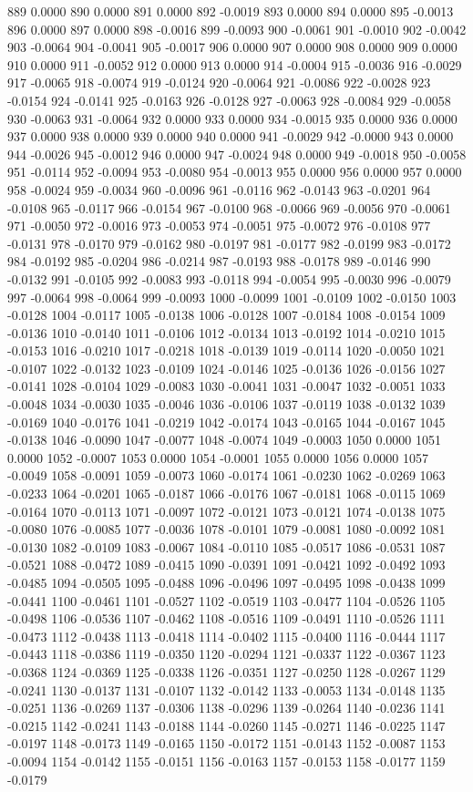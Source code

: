 889 0.0000
890 0.0000
891 0.0000
892 -0.0019
893 0.0000
894 0.0000
895 -0.0013
896 0.0000
897 0.0000
898 -0.0016
899 -0.0093
900 -0.0061
901 -0.0010
902 -0.0042
903 -0.0064
904 -0.0041
905 -0.0017
906 0.0000
907 0.0000
908 0.0000
909 0.0000
910 0.0000
911 -0.0052
912 0.0000
913 0.0000
914 -0.0004
915 -0.0036
916 -0.0029
917 -0.0065
918 -0.0074
919 -0.0124
920 -0.0064
921 -0.0086
922 -0.0028
923 -0.0154
924 -0.0141
925 -0.0163
926 -0.0128
927 -0.0063
928 -0.0084
929 -0.0058
930 -0.0063
931 -0.0064
932 0.0000
933 0.0000
934 -0.0015
935 0.0000
936 0.0000
937 0.0000
938 0.0000
939 0.0000
940 0.0000
941 -0.0029
942 -0.0000
943 0.0000
944 -0.0026
945 -0.0012
946 0.0000
947 -0.0024
948 0.0000
949 -0.0018
950 -0.0058
951 -0.0114
952 -0.0094
953 -0.0080
954 -0.0013
955 0.0000
956 0.0000
957 0.0000
958 -0.0024
959 -0.0034
960 -0.0096
961 -0.0116
962 -0.0143
963 -0.0201
964 -0.0108
965 -0.0117
966 -0.0154
967 -0.0100
968 -0.0066
969 -0.0056
970 -0.0061
971 -0.0050
972 -0.0016
973 -0.0053
974 -0.0051
975 -0.0072
976 -0.0108
977 -0.0131
978 -0.0170
979 -0.0162
980 -0.0197
981 -0.0177
982 -0.0199
983 -0.0172
984 -0.0192
985 -0.0204
986 -0.0214
987 -0.0193
988 -0.0178
989 -0.0146
990 -0.0132
991 -0.0105
992 -0.0083
993 -0.0118
994 -0.0054
995 -0.0030
996 -0.0079
997 -0.0064
998 -0.0064
999 -0.0093
1000 -0.0099
1001 -0.0109
1002 -0.0150
1003 -0.0128
1004 -0.0117
1005 -0.0138
1006 -0.0128
1007 -0.0184
1008 -0.0154
1009 -0.0136
1010 -0.0140
1011 -0.0106
1012 -0.0134
1013 -0.0192
1014 -0.0210
1015 -0.0153
1016 -0.0210
1017 -0.0218
1018 -0.0139
1019 -0.0114
1020 -0.0050
1021 -0.0107
1022 -0.0132
1023 -0.0109
1024 -0.0146
1025 -0.0136
1026 -0.0156
1027 -0.0141
1028 -0.0104
1029 -0.0083
1030 -0.0041
1031 -0.0047
1032 -0.0051
1033 -0.0048
1034 -0.0030
1035 -0.0046
1036 -0.0106
1037 -0.0119
1038 -0.0132
1039 -0.0169
1040 -0.0176
1041 -0.0219
1042 -0.0174
1043 -0.0165
1044 -0.0167
1045 -0.0138
1046 -0.0090
1047 -0.0077
1048 -0.0074
1049 -0.0003
1050 0.0000
1051 0.0000
1052 -0.0007
1053 0.0000
1054 -0.0001
1055 0.0000
1056 0.0000
1057 -0.0049
1058 -0.0091
1059 -0.0073
1060 -0.0174
1061 -0.0230
1062 -0.0269
1063 -0.0233
1064 -0.0201
1065 -0.0187
1066 -0.0176
1067 -0.0181
1068 -0.0115
1069 -0.0164
1070 -0.0113
1071 -0.0097
1072 -0.0121
1073 -0.0121
1074 -0.0138
1075 -0.0080
1076 -0.0085
1077 -0.0036
1078 -0.0101
1079 -0.0081
1080 -0.0092
1081 -0.0130
1082 -0.0109
1083 -0.0067
1084 -0.0110
1085 -0.0517
1086 -0.0531
1087 -0.0521
1088 -0.0472
1089 -0.0415
1090 -0.0391
1091 -0.0421
1092 -0.0492
1093 -0.0485
1094 -0.0505
1095 -0.0488
1096 -0.0496
1097 -0.0495
1098 -0.0438
1099 -0.0441
1100 -0.0461
1101 -0.0527
1102 -0.0519
1103 -0.0477
1104 -0.0526
1105 -0.0498
1106 -0.0536
1107 -0.0462
1108 -0.0516
1109 -0.0491
1110 -0.0526
1111 -0.0473
1112 -0.0438
1113 -0.0418
1114 -0.0402
1115 -0.0400
1116 -0.0444
1117 -0.0443
1118 -0.0386
1119 -0.0350
1120 -0.0294
1121 -0.0337
1122 -0.0367
1123 -0.0368
1124 -0.0369
1125 -0.0338
1126 -0.0351
1127 -0.0250
1128 -0.0267
1129 -0.0241
1130 -0.0137
1131 -0.0107
1132 -0.0142
1133 -0.0053
1134 -0.0148
1135 -0.0251
1136 -0.0269
1137 -0.0306
1138 -0.0296
1139 -0.0264
1140 -0.0236
1141 -0.0215
1142 -0.0241
1143 -0.0188
1144 -0.0260
1145 -0.0271
1146 -0.0225
1147 -0.0197
1148 -0.0173
1149 -0.0165
1150 -0.0172
1151 -0.0143
1152 -0.0087
1153 -0.0094
1154 -0.0142
1155 -0.0151
1156 -0.0163
1157 -0.0153
1158 -0.0177
1159 -0.0179
